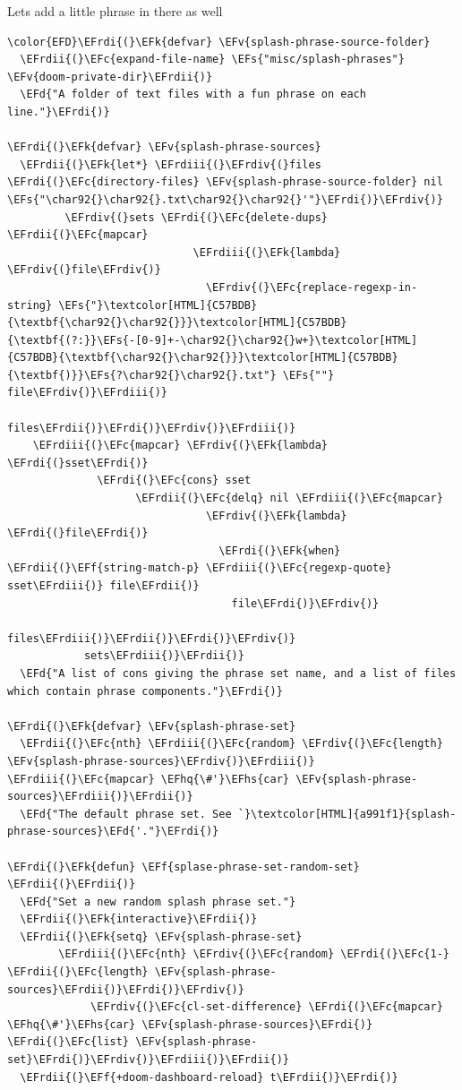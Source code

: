 \documentclass{scrartcl}
\newcommand{\EFk}[1]{\textcolor{EFk}{#1}} %
\newcommand{\EFd}[1]{\textcolor{EFd}{#1}} %
\newcommand{\EFs}[1]{\textcolor{EFs}{#1}} %
\newcommand{\EFc}[1]{\textcolor{EFc}{#1}} %
\newcommand{\EFv}[1]{\textcolor{EFv}{#1}} %
\newcommand{\EFf}[1]{\textcolor{EFf}{#1}} %
\newcommand{\EFhq}[1]{#1} %
\newcommand{\EFhs}[1]{#1} %
\newcommand{\EFrdi}[1]{#1} %
\newcommand{\EFrdii}[1]{#1} %
\newcommand{\EFrdiii}[1]{#1} %
\newcommand{\EFrdiv}[1]{#1} %
\begin{document}
Lets add a little phrase in there as well
\begin{Code}
\begin{Verbatim}[]
\color{EFD}\EFrdi{(}\EFk{defvar} \EFv{splash-phrase-source-folder}
  \EFrdii{(}\EFc{expand-file-name} \EFs{"misc/splash-phrases"} \EFv{doom-private-dir}\EFrdii{)}
  \EFd{"A folder of text files with a fun phrase on each line."}\EFrdi{)}

\EFrdi{(}\EFk{defvar} \EFv{splash-phrase-sources}
  \EFrdii{(}\EFk{let*} \EFrdiii{(}\EFrdiv{(}files \EFrdi{(}\EFc{directory-files} \EFv{splash-phrase-source-folder} nil \EFs{"\char92{}\char92{}.txt\char92{}\char92{}'"}\EFrdi{)}\EFrdiv{)}
         \EFrdiv{(}sets \EFrdi{(}\EFc{delete-dups} \EFrdii{(}\EFc{mapcar}
                             \EFrdiii{(}\EFk{lambda} \EFrdiv{(}file\EFrdiv{)}
                               \EFrdiv{(}\EFc{replace-regexp-in-string} \EFs{"}\textcolor[HTML]{C57BDB}{\textbf{\char92{}\char92{}}}\textcolor[HTML]{C57BDB}{\textbf{(?:}}\EFs{-[0-9]+-\char92{}\char92{}w+}\textcolor[HTML]{C57BDB}{\textbf{\char92{}\char92{}}}\textcolor[HTML]{C57BDB}{\textbf{)}}\EFs{?\char92{}\char92{}.txt"} \EFs{""} file\EFrdiv{)}\EFrdiii{)}
                             files\EFrdii{)}\EFrdi{)}\EFrdiv{)}\EFrdiii{)}
    \EFrdiii{(}\EFc{mapcar} \EFrdiv{(}\EFk{lambda} \EFrdi{(}sset\EFrdi{)}
              \EFrdi{(}\EFc{cons} sset
                    \EFrdii{(}\EFc{delq} nil \EFrdiii{(}\EFc{mapcar}
                               \EFrdiv{(}\EFk{lambda} \EFrdi{(}file\EFrdi{)}
                                 \EFrdi{(}\EFk{when} \EFrdii{(}\EFf{string-match-p} \EFrdiii{(}\EFc{regexp-quote} sset\EFrdiii{)} file\EFrdii{)}
                                   file\EFrdi{)}\EFrdiv{)}
                               files\EFrdiii{)}\EFrdii{)}\EFrdi{)}\EFrdiv{)}
            sets\EFrdiii{)}\EFrdii{)}
  \EFd{"A list of cons giving the phrase set name, and a list of files which contain phrase components."}\EFrdi{)}

\EFrdi{(}\EFk{defvar} \EFv{splash-phrase-set}
  \EFrdii{(}\EFc{nth} \EFrdiii{(}\EFc{random} \EFrdiv{(}\EFc{length} \EFv{splash-phrase-sources}\EFrdiv{)}\EFrdiii{)} \EFrdiii{(}\EFc{mapcar} \EFhq{\#'}\EFhs{car} \EFv{splash-phrase-sources}\EFrdiii{)}\EFrdii{)}
  \EFd{"The default phrase set. See `}\textcolor[HTML]{a991f1}{splash-phrase-sources}\EFd{'."}\EFrdi{)}

\EFrdi{(}\EFk{defun} \EFf{splase-phrase-set-random-set} \EFrdii{(}\EFrdii{)}
  \EFd{"Set a new random splash phrase set."}
  \EFrdii{(}\EFk{interactive}\EFrdii{)}
  \EFrdii{(}\EFk{setq} \EFv{splash-phrase-set}
        \EFrdiii{(}\EFc{nth} \EFrdiv{(}\EFc{random} \EFrdi{(}\EFc{1-} \EFrdii{(}\EFc{length} \EFv{splash-phrase-sources}\EFrdii{)}\EFrdi{)}\EFrdiv{)}
             \EFrdiv{(}\EFc{cl-set-difference} \EFrdi{(}\EFc{mapcar} \EFhq{\#'}\EFhs{car} \EFv{splash-phrase-sources}\EFrdi{)} \EFrdi{(}\EFc{list} \EFv{splash-phrase-set}\EFrdi{)}\EFrdiv{)}\EFrdiii{)}\EFrdii{)}
  \EFrdii{(}\EFf{+doom-dashboard-reload} t\EFrdii{)}\EFrdi{)}


\end{Verbatim}
\end{Code}
\end{document}
